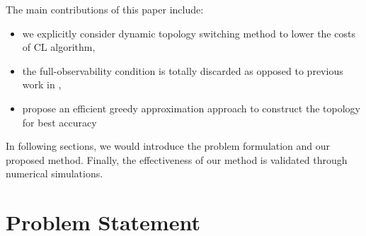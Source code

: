 \documentclass[conference]{IEEEtran}
\begin{document}
The main contributions of this paper include:
\begin{itemize}
	\item we explicitly consider dynamic topology switching method to lower the costs of CL algorithm,
	\item the full-observability condition is totally discarded as opposed to previous work in \cite{mourikis2006optimal,chang2018optimal},
	\item propose an efficient greedy approximation approach to construct the topology for best accuracy
\end{itemize}
In following sections, we would introduce the problem formulation and our proposed method.
Finally, the effectiveness of our method is validated through numerical simulations.


\section{Problem Statement}
\end{document}
